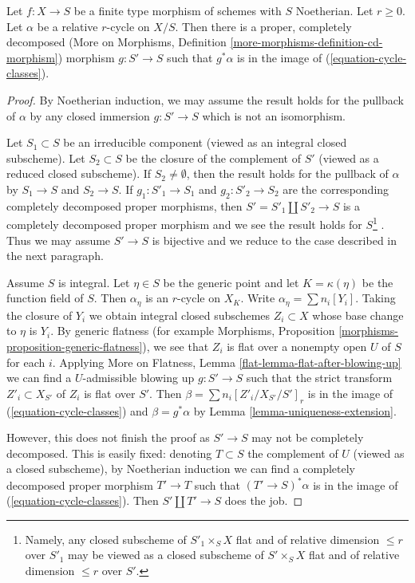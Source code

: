 \begin{lemma}
\label{lemma-get-cycles}
Let $f : X \to S$ be a finite type morphism of schemes with $S$ Noetherian.
Let $r \geq 0$. Let $\alpha$ be a relative $r$-cycle on $X/S$. Then there is
a proper, completely decomposed
(More on Morphisms, Definition \ref{more-morphisms-definition-cd-morphism})
morphism $g : S' \to S$ such that $g^*\alpha$ is in the image of
(\ref{equation-cycle-classes}).
\end{lemma}

\begin{proof}
By Noetherian induction, we may assume the result holds for the pullback of
$\alpha$ by any closed immersion $g : S' \to S$ which is not an isomorphism.

\medskip\noindent
Let $S_1 \subset S$ be an irreducible component (viewed as an integral closed
subscheme). Let $S_2 \subset S$ be the closure of the complement of $S'$
(viewed as a reduced closed subscheme). If $S_2 \not = \emptyset$, then
the result holds for the pullback of $\alpha$ by $S_1 \to S$ and $S_2 \to S$.
If $g_1 : S'_1 \to S_1$ and $g_2 : S'_2 \to S_2$
are the corresponding completely decomposed proper morphisms,
then $S' = S'_1 \amalg S'_2 \to S$
is a completely decomposed proper morphism and
we see the result holds for $S$\footnote{Namely, any closed
subscheme of $S'_1 \times_S X$ flat and of relative dimension
$\leq r$ over $S'_1$ may be viewed as a closed subscheme of $S' \times_S X$
flat and of relative dimension $\leq r$ over $S'$.}
. Thus we may assume $S' \to S$ is bijective
and we reduce to the case described in the next paragraph.

\medskip\noindent
Assume $S$ is integral. Let $\eta \in S$ be the generic point
and let $K = \kappa(\eta)$ be the function field of $S$.
Then $\alpha_\eta$ is an $r$-cycle on $X_K$.
Write $\alpha_\eta = \sum n_i[Y_i]$.
Taking the closure of $Y_i$ we obtain integral closed subschemes
$Z_i \subset X$ whose base change to $\eta$ is $Y_i$.
By generic flatness (for example Morphisms,
Proposition \ref{morphisms-proposition-generic-flatness}),
we see that $Z_i$ is flat over a nonempty open $U$ of $S$ for each $i$.
Applying More on Flatness, Lemma \ref{flat-lemma-flat-after-blowing-up}
we can find a $U$-admissible blowing up $g : S' \to S$
such that the strict transform $Z'_i \subset X_{S'}$
of $Z_i$ is flat over $S'$. Then $\beta = \sum n_i[Z'_i/X_{S'}/S']_r$
is in the image of (\ref{equation-cycle-classes}) and $\beta = g^*\alpha$
by Lemma \ref{lemma-uniqueness-extension}.

\medskip\noindent
However, this does not finish the proof as $S' \to S$ may not be
completely decomposed. This is easily fixed: denoting $T \subset S$
the complement of $U$ (viewed as a closed subscheme), by Noetherian
induction we can find a completely decomposed proper morphism
$T' \to T$ such that $(T' \to S)^*\alpha$
is in the image of (\ref{equation-cycle-classes}). Then
$S' \amalg T' \to S$ does the job.
\end{proof}

